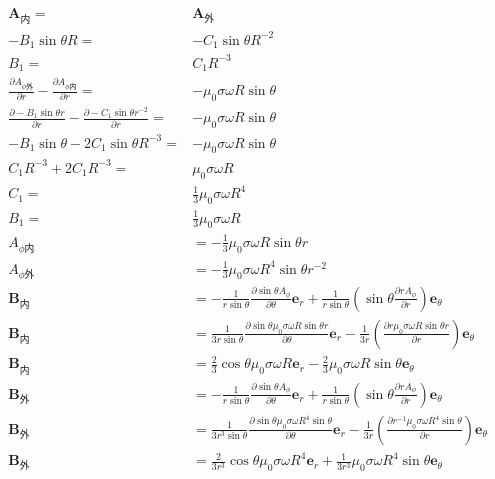 \begin{align*}
\boldsymbol{A}_{\text{内}}=&\boldsymbol{A}_{\text{外}}\\
-B_1\sin\theta R
=&-C_1\sin\theta R^{-2}\\
B_1
=&C_1R^{-3}\\
\frac{\partial A_{\phi\text{外}}}{\partial r}-\frac{\partial A_{\phi\text{内}}}{\partial r}=&-\mu_0\sigma\omega R\sin\theta\\
\frac{\partial -B_1\sin\theta r}{\partial r}-\frac{\partial -C_1\sin\theta r^{-2}}{\partial r}=&-\mu_0\sigma\omega R\sin\theta\\
-B_1\sin\theta  -2C_1\sin\theta R^{-3}=&-\mu_0\sigma\omega R\sin\theta\\
C_1R^{-3}+2C_1R^{-3}=&\mu_0\sigma\omega R\\
C_1=&\frac{1}{3}\mu_0\sigma\omega R^4\\
B_1=&\frac{1}{3}\mu_0\sigma\omega R\\
A_{\phi\text{内}}
&=-\frac{1}{3}\mu_0\sigma\omega R\sin\theta r\\
A_{\phi\text{外}}
&=-\frac{1}{3}\mu_0\sigma\omega R^4\sin\theta r^{-2}\\
\boldsymbol{B}_{\text{内}}&=-\frac{1}{r\sin\theta}
\frac{\partial\sin\theta  A_{\phi}}{\partial \theta}\boldsymbol{e}_r
+\frac{1}{r\sin\theta }\left(\sin\theta\frac{\partial r A_{\phi}}{\partial r}
\right)\boldsymbol{e}_\theta\\
\boldsymbol{B}_{\text{内}}&=\frac{1}{3r\sin\theta}
\frac{\partial\sin\theta  \mu_0\sigma\omega R\sin\theta r}{\partial \theta}\boldsymbol{e}_r
-\frac{1}{3r }\left(\frac{\partial r \mu_0\sigma\omega R\sin\theta r}{\partial r}
\right)\boldsymbol{e}_\theta\\
\boldsymbol{B}_{\text{内}}&=\frac{2}{3}
\cos\theta  \mu_0\sigma\omega R \boldsymbol{e}_r
-\frac{2}{3 } \mu_0\sigma\omega R\sin\theta 
\boldsymbol{e}_\theta\\
\boldsymbol{B}_{\text{外}}&=-\frac{1}{r\sin\theta}
\frac{\partial\sin\theta  A_{\phi}}{\partial \theta}\boldsymbol{e}_r
+\frac{1}{r\sin\theta }\left(\sin\theta\frac{\partial r A_{\phi}}{\partial r}
\right)\boldsymbol{e}_\theta\\
\boldsymbol{B}_{\text{外}}&=\frac{1}{3r^3\sin\theta}
\frac{\partial\sin\theta  \mu_0\sigma\omega R^4\sin\theta }{\partial \theta}\boldsymbol{e}_r
-\frac{1}{3r }\left(\frac{\partial  r^{-1}\mu_0\sigma\omega R^4\sin\theta }{\partial r}
\right)\boldsymbol{e}_\theta\\
\boldsymbol{B}_{\text{外}}&=\frac{2}{3r^3}
\cos\theta  \mu_0\sigma\omega R^4 \boldsymbol{e}_r
+\frac{1}{3 r^3} \mu_0\sigma\omega R^4\sin\theta 
\boldsymbol{e}_\theta
\end{align*}
